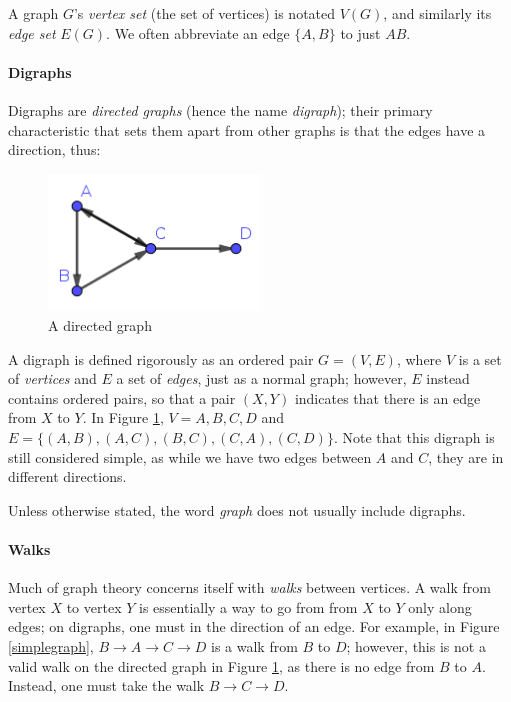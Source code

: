 	A graph \(G\)'s \textit{vertex set} (the set of vertices) is notated \(V(G)\), and similarly its \textit{edge set} \(E(G)\). We often abbreviate an edge \(\{A,B\}\) to just \(AB\).
	
	\paragraph{Digraphs}
	
	Digraphs are \textit{directed graphs} (hence the name \textit{digraph}); their primary characteristic that sets them apart from other graphs is that the edges have a direction, thus:
	
	\begin{figure}[h]
		\centering
		\includegraphics[width=0.5\textwidth]{directedgraph}
		\caption{A directed graph}
		\label{directedgraph}
	\end{figure}
	
	A digraph is defined rigorously as an ordered pair \(G=(V,E)\), where \(V\) is a set of \textit{vertices} and \(E\) a set of \textit{edges}, just as a normal graph; however, \(E\) instead contains ordered pairs, so that a pair \((X,Y)\) indicates that there is an edge from \(X\) to \(Y\). In Figure \ref{directedgraph}, \(V={A,B,C,D}\) and \(E=\{(A,B),(A,C),(B,C),(C,A),(C,D)\}\). Note that this digraph is still considered simple, as while we have two edges between \(A\) and \(C\), they are in different directions.
	
	Unless otherwise stated, the word \textit{graph} does not usually include digraphs.
	
	\paragraph{Walks}
	
	Much of graph theory concerns itself with \textit{walks} between vertices. A walk from vertex \(X\) to vertex \(Y\) is essentially a way to go from from \(X\) to \(Y\)  only along edges; on digraphs, one must  in the direction of an edge. For example, in Figure \ref{simplegraph}, \(B \rightarrow A \rightarrow C \rightarrow D\) is a walk from \(B\) to \(D\); however, this is not a valid walk on the directed graph in Figure \ref{directedgraph}, as there is no edge from \(B\) to \(A\). Instead, one must take the walk \(B \rightarrow C \rightarrow D\).
	
